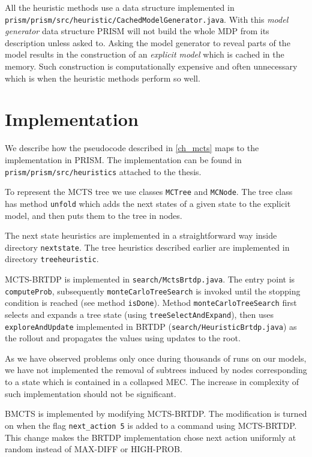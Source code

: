 All the heuristic methods use a data structure implemented in
\verb|prism/prism/src/heuristic/CachedModelGenerator.java|.
With this {\em model generator} data structure PRISM will not build the
whole MDP from its description unless asked to.
Asking the model generator to reveal parts of the model results in the
construction of an {\em explicit model} which is cached in the memory.
Such construction is computationally expensive and often unnecessary
which is when the heuristic methods perform so well.

\section{Implementation}

We describe how the pseudocode described in \autoref{ch_mcts} maps to
the implementation in PRISM. The implementation can be found in
\verb|prism/prism/src/heuristics| attached to the thesis.

To represent the MCTS tree we use classes \verb|MCTree| and
\verb|MCNode|. The tree class has method \verb|unfold|
which adds the next states of a given state
to the explicit model, and then puts them to the tree in nodes.

The next state heuristics are implemented in a straightforward way
inside directory \verb|nextstate|. The tree heuristics described earlier
are implemented in directory \verb|treeheuristic|.

MCTS-BRTDP is implemented in \verb|search/MctsBrtdp.java|. The entry
point is \verb|computeProb|, subsequently
\verb|monteCarloTreeSearch| is invoked until the stopping condition
is reached (see method \verb|isDone|). Method
\verb|monteCarloTreeSearch| first selects and expands a tree state
(using \verb|treeSelectAndExpand|),
then uses \verb|exploreAndUpdate| implemented in BRTDP
(\verb|search/HeuristicBrtdp.java|) as the rollout and propagates
the values using updates to the root.

As we have observed problems only once during thousands of runs on our
models, we have not implemented the removal of subtrees induced by nodes
corresponding to a state which is contained in a collapsed MEC. The
increase in complexity of such implementation should not be significant.

BMCTS is implemented by modifying MCTS-BRTDP. The modification is turned
on when the flag \verb|next_action 5| is added to a command using
MCTS-BRTDP. This change makes the BRTDP implementation chose next action
uniformly at random instead of MAX-DIFF or HIGH-PROB.


